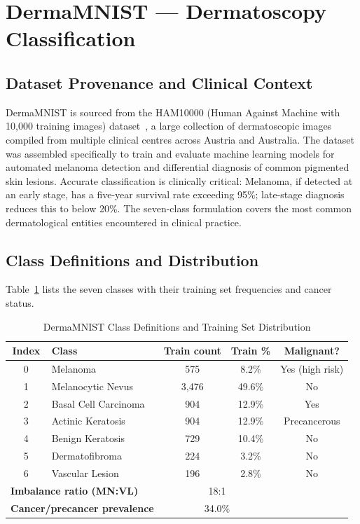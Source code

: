 \section{DermaMNIST — Dermatoscopy Classification}

\subsection{Dataset Provenance and Clinical Context}

DermaMNIST is sourced from the HAM10000 (Human Against Machine with 10,000 training images) dataset~\cite{tschandl2018ham10000}, a large collection of dermatoscopic images compiled from multiple clinical centres across Austria and Australia. The dataset was assembled specifically to train and evaluate machine learning models for automated melanoma detection and differential diagnosis of common pigmented skin lesions. Accurate classification is clinically critical: Melanoma, if detected at an early stage, has a five-year survival rate exceeding 95\%; late-stage diagnosis reduces this to below 20\%. The seven-class formulation covers the most common dermatological entities encountered in clinical practice.

\subsection{Class Definitions and Distribution}

Table~\ref{tab:dermamnist_classes} lists the seven classes with their training set frequencies and cancer status.

\begin{table}[h]
\footnotesize
\centering
\caption{DermaMNIST Class Definitions and Training Set Distribution}
\label{tab:dermamnist_classes}
\begin{tabular}{clccc}
\toprule
\textbf{Index} & \textbf{Class} & \textbf{Train count} & \textbf{Train \%} & \textbf{Malignant?} \\
\midrule
0 & Melanoma               & 575  & 8.2\%  & Yes (high risk) \\
1 & Melanocytic Nevus      & 3,476 & 49.6\% & No              \\
2 & Basal Cell Carcinoma   & 904  & 12.9\% & Yes             \\
3 & Actinic Keratosis      & 904  & 12.9\% & Precancerous    \\
4 & Benign Keratosis       & 729  & 10.4\% & No              \\
5 & Dermatofibroma         & 224  & 3.2\%  & No              \\
6 & Vascular Lesion        & 196  & 2.8\%  & No              \\
\midrule
\multicolumn{2}{l}{\textbf{Imbalance ratio (MN:VL)}} & \multicolumn{2}{c}{18:1} \\
\multicolumn{2}{l}{\textbf{Cancer/precancer prevalence}} & \multicolumn{2}{c}{34.0\%} \\
\bottomrule
\end{tabular}
\end{table}

